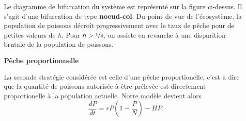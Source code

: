 \documentclass[12pt, answers]{exam}
\begin{document}
\begin{questions}
\begin{parts}
    \begin{figure}[h]
      \centering
    \end{figure}

    \begin{solution}
      {\color{blue}
        Le diagramme de bifurcation du système est représenté sur la figure ci-dessus.
        Il s'agit d'une bifurcation de type \textbf{noeud-col}.
        Du point de vue de l'écosystème, la population de poissons décroît progressivement avec le taux de pêche pour de petites valeurs de $h$.
        Pour $h > \nicefrac{1}{4}$, on assiste en revanche à une disparition brutale de la population de poissons.
      }
    \end{solution}
  \end{parts}

  \bigskip

  \textbf{Pêche proportionnelle}

  La seconde stratégie considérée est celle d'une pêche proportionelle, c'est à dire que la quantité de poissons autorisée à être prélevée est directement proportionelle à la population actuelle.
  Notre modèle devient alors
  \[
  \dfrac{dP}{dt} = r P \left( 1 - \dfrac{P}{N} \right) - HP.
  \]

\end{questions}
\end{document}
